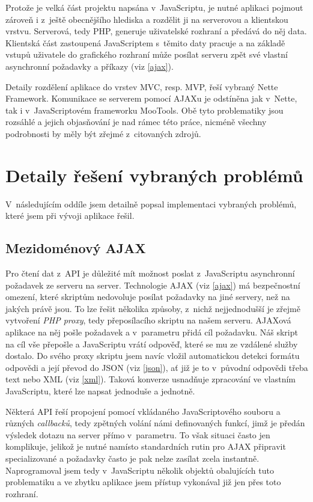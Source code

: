Protože je velká část projektu napsána v~JavaScriptu, je nutné
aplikaci pojmout zároveň i z~ještě obecnějšího hlediska a rozdělit ji
na serverovou a klientskou vrstvu. Serverová, tedy PHP, generuje
uživatelské rozhraní a předává do něj data. Klientská část zastoupená
JavaScriptem s~těmito daty pracuje a na základě vstupů uživatele do
grafického rozhraní může posílat serveru zpět své vlastní asynchronní
požadavky a příkazy (viz \ref{ajax}).

Detaily rozdělení aplikace do vrstev MVC, resp. MVP, řeší vybraný
Nette Framework. Komunikace se serverem pomocí AJAXu je odstíněna jak
v~Nette, tak i v~JavaScriptovém frameworku MooTools. Obě tyto
problematiky jsou rozsáhlé a jejich objasňování je nad rámec této
práce, nicméně všechny podrobnosti by měly být zřejmé z~citovaných
zdrojů.

\section{Detaily řešení vybraných problémů}
V~následujícím oddíle jsem detailně popsal implementaci vybraných
problémů, které jsem při vývoji aplikace řešil.

\subsection{Mezidoménový AJAX}
Pro čtení dat z~API je důležité mít možnost poslat
z~JavaScriptu asynchronní požadavek ze serveru na server. Technologie
AJAX (viz \ref{ajax}) má bezpečnostní omezení, které skriptům
nedovoluje posílat požadavky na jiné servery, než na jakých právě
jsou. To lze řešit několika způsoby, z~nichž nej\-jednodušší je zřejmě
vytvoření {\it PHP proxy}, tedy přeposílacího skriptu na našem
serveru. AJAXová aplikace na něj pošle požadavek a v~parametru přidá
cíl požadavku. Náš skript na cíl vše přepošle a JavaScriptu vrátí
odpověď, které se mu ze vzdálené služby dostalo. Do svého proxy
skriptu jsem navíc vložil automatickou detekci formátu odpovědi a
její převod do JSON (viz \ref{json}), ať již je to v~původní odpovědi
třeba text nebo XML (viz \ref{xml}). Taková konverze usnadňuje
zpracování ve vlastním JavaScriptu, které lze napsat jednoduše a jednotně.

Některá API řeší propojení pomocí vkládaného JavaScriptového souboru
a různých {\it callbacků}, tedy zpětných volání námi definovaných
funkcí, jimž je předán výsledek dotazu na server přímo v~parametru.
To však situaci často jen komplikuje, jelikož je nutné namísto
standardních rutin pro AJAX připravit specializované a požadavky
často je pak nelze zasílat zcela instantně. Naprogramoval jsem tedy
v~JavaScriptu několik objektů obalujících tuto problematiku a ve zbytku
aplikace jsem přístup vykonával již jen přes toto rozhraní.


